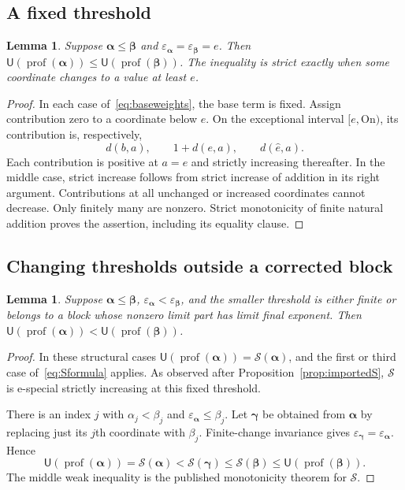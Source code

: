 \documentclass[11pt,a4paper]{article}
\newtheorem{lemma}[theorem]{Lemma}
\theoremstyle{definition}
\newcommand{\On}{\mathrm{On}}
\newcommand{\OpS}{\mathcal S}
\newcommand{\FunU}{\mathsf U}
\newcommand{\prof}{\operatorname{prof}}
\newcommand{\seq}[1]{\boldsymbol{#1}}
\newcommand{\epsa}{\varepsilon_{\seq\alpha}}
\newcommand{\epsb}{\varepsilon_{\seq\beta}}
\newcommand{\diff}[2]{d(#1,#2)}
\begin{document}
\subsection{A fixed threshold}

\begin{lemma}\label{block:lem:fixed}
Suppose $\seq\alpha\le\seq\beta$ and $\epsa=\epsb=e$. Then $\FunU(\prof(\seq\alpha))\le\FunU(\prof(\seq\beta))$. The inequality is strict exactly when some coordinate changes to a value at least $e$.
\end{lemma}
\begin{proof}
In each case of~\eqref{eq:baseweights}, the base term is fixed. Assign contribution zero to a coordinate below $e$. On the exceptional interval $[e,\On)$, its contribution is, respectively,
\[
 \diff b a,\qquad 1+\diff e a,\qquad \diff{\widehat e}a.
\]
Each contribution is positive at $a=e$ and strictly increasing thereafter. In the middle case, strict increase follows from strict increase of addition in its right argument. Contributions at all unchanged or increased coordinates cannot decrease. Only finitely many are nonzero. Strict monotonicity of finite natural addition proves the assertion, including its equality clause.
\end{proof}

\subsection{Changing thresholds outside a corrected block}

\begin{lemma}\label{block:lem:ordinary-source}
Suppose $\seq\alpha\le\seq\beta$, $\epsa<\epsb$, and the smaller threshold is either finite or belongs to a block whose nonzero limit part has limit final exponent. Then $\FunU(\prof(\seq\alpha))<\FunU(\prof(\seq\beta))$.
\end{lemma}
\begin{proof}
In these structural cases $\FunU(\prof(\seq\alpha))=\OpS(\seq\alpha)$, and the first or third case of~\eqref{eq:Sformula} applies. As observed after Proposition~\ref{prop:importedS}, $\OpS$ is e-special strictly increasing at this fixed threshold.

There is an index $j$ with $\alpha_j<\beta_j$ and $\epsa\le\beta_j$. Let $\seq\gamma$ be obtained from $\seq\alpha$ by replacing just its $j$th coordinate with $\beta_j$. Finite-change invariance gives $\varepsilon_{\seq\gamma}=\epsa$. Hence
\[
 \FunU(\prof(\seq\alpha))=\OpS(\seq\alpha)<\OpS(\seq\gamma)
       \le\OpS(\seq\beta)\le\FunU(\prof(\seq\beta)).
\]
The middle weak inequality is the published monotonicity theorem for $\OpS$.
\end{proof}
\end{document}
